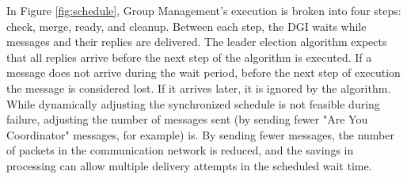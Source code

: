 In Figure \ref{fig:schedule}, Group Management's execution is broken into four steps: check, merge, ready, and cleanup.
Between each step, the DGI waits while messages and their replies are delivered.
The leader election algorithm expects that all replies arrive before the next step of the algorithm is executed.
If a message does not arrive during the wait period, before the next step of execution the message is considered lost.
If it arrives later, it is ignored by the algorithm.
While dynamically adjusting the synchronized schedule is not feasible during failure, adjusting the number of messages sent (by sending fewer "Are You Coordinator" messages, for example) is.
By sending fewer messages, the number of packets in the communication network is reduced, and the savings in processing can allow multiple delivery attempts in the scheduled wait time.
